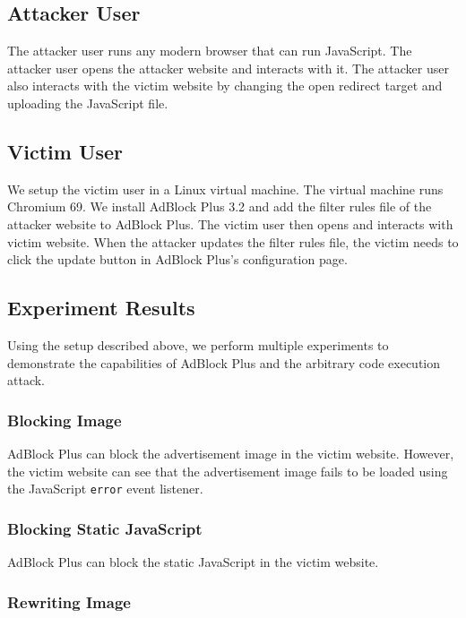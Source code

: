 \documentclass[conference]{IEEEtran}
\begin{document}
\subsection{Attacker User}

The attacker user runs any modern browser that can run JavaScript. The attacker user opens the attacker website and interacts with it. The attacker user also interacts with the victim website by changing the open redirect target and uploading the JavaScript file.

\subsection{Victim User}

We setup the victim user in a Linux virtual machine. The virtual machine runs Chromium 69. We install AdBlock Plus 3.2 and add the filter rules file of the attacker website to AdBlock Plus. The victim user then opens and interacts with victim website. When the attacker updates the filter rules file, the victim needs to click the update button in AdBlock Plus's configuration page.

\subsection{Experiment Results}

Using the setup described above, we perform multiple experiments to demonstrate the capabilities of AdBlock Plus and the arbitrary code execution attack.

\subsubsection{Blocking Image}

AdBlock Plus can block the advertisement image in the victim website. However, the victim website can see that the advertisement image fails to be loaded using the JavaScript \lstinline{error} event listener.

\subsubsection{Blocking Static JavaScript}

AdBlock Plus can block the static JavaScript in the victim website.

\subsubsection{Rewriting Image}
\end{document}
